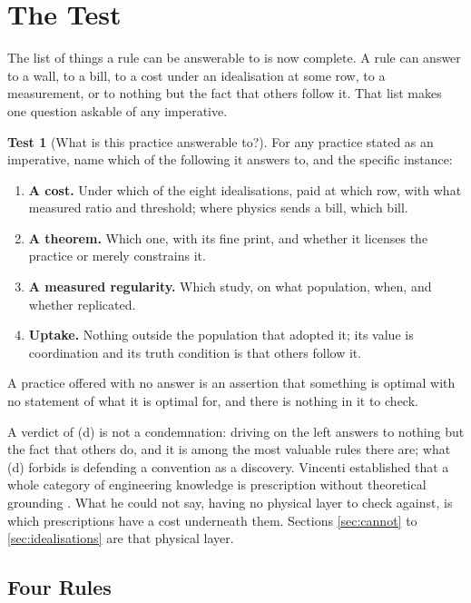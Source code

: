 \documentclass[11pt,oneside]{article}
\theoremstyle{definition}
\newtheorem{test}{Test}
\theoremstyle{remark}
\begin{document}
\section{The Test}\label{sec:practice}
The list of things a rule can be answerable to is now complete. A rule can answer to a wall, to a bill, to a cost under an idealisation at some
row, to a measurement, or to nothing but the fact that others follow it. That list makes
one question askable of any imperative.

\begin{test}[What is this practice answerable to?]\label{test}
For any practice stated as an imperative, name which of the following it answers to, and
the specific instance:
\begin{enumerate}[leftmargin=1.6em,itemsep=1pt]
\item[\textbf{(a)}] \textbf{A cost.} Under which of the eight idealisations, paid at which
row, with what measured ratio and threshold; where physics sends a bill, which bill.
\item[\textbf{(b)}] \textbf{A theorem.} Which one, with its fine print, and whether it
licenses the practice or merely constrains it.
\item[\textbf{(c)}] \textbf{A measured regularity.} Which study, on what population, when,
and whether replicated.
\item[\textbf{(d)}] \textbf{Uptake.} Nothing outside the population that adopted it; its
value is coordination and its truth condition is that others follow it.
\end{enumerate}
A practice offered with no answer is an assertion that something is optimal with no
statement of what it is optimal for, and there is nothing in it to check.
\end{test}

A verdict of (d) is not a condemnation: driving on the left answers to nothing but the fact
that others do, and it is among the most valuable rules there are; what (d) forbids is
defending a convention as a discovery. Vincenti established that a
whole category of engineering knowledge is prescription without theoretical grounding
\cite{vincenti1990,abran2006}. What he could not say, having no physical layer to check
against, is which prescriptions have a cost underneath them. Sections \ref{sec:cannot} to \ref{sec:idealisations} are that physical layer.

\subsection{Four Rules}\label{sec:verdicts}
\end{document}
